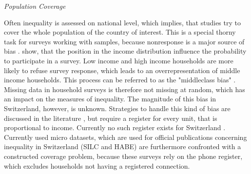 \documentclass[twoside]{article}\usepackage[]{graphicx}\usepackage[]{color}
\begin{document}
\begin{multicols}{2}


\emph{Population Coverage}
 
Often inequality is assessed on national level, which implies, that studies try to cover the whole population of the country of interest. This is a special thorny task for surveys working with samples, because nonresponse is a major source of bias \citep{bethlehem_handbook_2011}.  \citep{korinek_survey_2006} show, that the position in the income distribution influence the probability to participate in a survey. Low income and high income households are more likely to refuse survey response, which leads to an overrepresentation of middle income households. This process can be referred to as the "middleclass bias" \citep{diekmann_empirische_2009}. Missing data in household surveys is therefore not missing at random, which has an impact on the measures of inequality. The magnitude of this bias in Switzerland, however, is unknown. Strategies to handle this kind of bias are discussed in the literature \citep{sarndal_model_2003}, but require a register for every unit, that is proportional to income. Currently no such register exists for Switzerland \citet[43]{muller_vermogenslage_2014}. Currently used micro datasets, which are used for official publications concerning inequality in Switzerland (SILC and HABE) are furthermore confronted with a constructed coverage problem, because these surveys rely on the phone register, which excludes households not having a registered connection. \\


\end{multicols}
\end{document}
